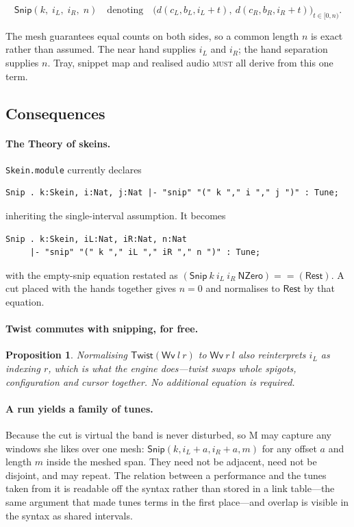 \documentclass[11pt,a4paper]{article}
\newcommand{\MUST}{\textsc{must}}
\theoremstyle{definition}
\theoremstyle{plain}
\newtheorem{proposition}{Proposition}
\theoremstyle{remark}
\begin{document}
\[
\mathsf{Snip}(k,\; i_L,\; i_R,\; n)
\quad\text{denoting}\quad
\big(d(c_L,b_L,i_L+t),\ d(c_R,b_R,i_R+t)\big)_{t\in[0,n)} .
\]

The mesh guarantees equal counts on both sides, so a common length $n$ is exact rather than
assumed. The near hand supplies $i_L$ and $i_R$; the hand separation supplies $n$. Tray, snippet map
and realised audio \MUST{} all derive from this one term.

\subsection{Consequences}

\paragraph{The Theory of skeins.} \texttt{Skein.module} currently declares
\begin{lstlisting}
Snip . k:Skein, i:Nat, j:Nat |- "snip" "(" k "," i "," j ")" : Tune;
\end{lstlisting}
inheriting the single-interval assumption. It becomes
\begin{lstlisting}
Snip . k:Skein, iL:Nat, iR:Nat, n:Nat
     |- "snip" "(" k "," iL "," iR "," n ")" : Tune;
\end{lstlisting}
with the empty-snip equation restated as
$(\mathsf{Snip}\ k\ i_L\ i_R\ \mathsf{NZero}) == (\mathsf{Rest})$. A cut placed with the hands
together gives $n=0$ and normalises to $\mathsf{Rest}$ by that equation.

\paragraph{Twist commutes with snipping, for free.}
\begin{proposition}
Normalising $\mathsf{Twist}(\mathsf{Wv}\ l\ r)$ to $\mathsf{Wv}\ r\ l$ also reinterprets $i_L$ as
indexing $r$, which is what the engine does---twist swaps whole spigots, configuration and cursor
together. No additional equation is required.
\end{proposition}

\paragraph{A run yields a family of tunes.} Because the cut is virtual the band is never
disturbed, so M may capture any windows she likes over one mesh: $\mathsf{Snip}(k,i_L+a,i_R+a,m)$
for any offset $a$ and length $m$ inside the meshed span. They need not be adjacent, need not be
disjoint, and may repeat. The relation between a performance and the tunes taken from it is
readable off the syntax rather than stored in a link table---the same argument that made tunes
terms in the first place---and overlap is visible in the syntax as shared intervals.
\end{document}
